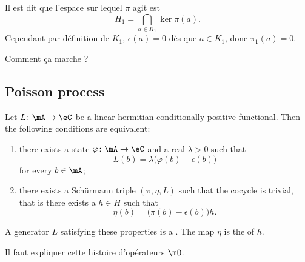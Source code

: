 \begin{probleme}
	Il est dit que l'espace sur lequel $\pi$ agit est
	\begin{equation}
		H_1=\bigcap_{\alpha\in K_1}\ker\pi(a).
	\end{equation}
	Cependant par définition de $K_1$, $\epsilon(a)=0$ dès que $a\in K_1$, donc $\pi_1(a)=0$.

	Comment ça marche ?
\end{probleme}

\subsection{Poisson process}

\begin{proposition}     \label{PropDefPoissonnL}
	Let $L\colon \mA\to \eC$ be a linear hermitian conditionally positive functional. Then the following conditions are equivalent:
	\begin{enumerate}
		\item
		      there exists a state $\varphi\colon \mA\to \eC$ and a real $\lambda>0$ such that
		      \begin{equation}
			      L(b)=\lambda\big( \varphi(b)-\epsilon(b) \big)
		      \end{equation}
		      for every $b\in\mA$;
		\item
		      there exists a Schürmann triple $(\pi,\eta,L)$ such that the cocycle is trivial, that is there exists a $h\in H$ such that
		      \begin{equation}
			      \eta(b)=\big( \pi(b)-\epsilon(b) \big)h.
		      \end{equation}
	\end{enumerate}
\end{proposition}
A generator $L$ satisfying these properties is a . The map $\eta$ is the  of $h$.

\begin{probleme}
	Il faut expliquer cette histoire d'opérateurs $\mO$.
\end{probleme}

